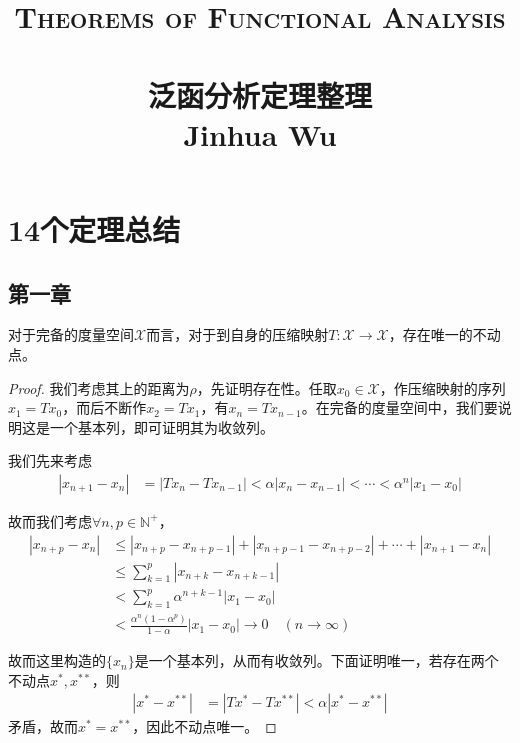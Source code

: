 
\usepackage{float}
\usepackage{enumitem}
\usepackage{amsmath}
\usepackage{amssymb}
\usepackage{hyperref}
\usepackage{cleveref}
\usepackage{annotate-equations}
\usepackage{zhlipsum}
\title{ \normalsize \textsc{Theorems of Functional Analysis}
		\\ [2.0cm]
		\HRule{1.5pt} \\
		\LARGE \textbf{\uppercase{泛函分析定理整理}
		\HRule{2.0pt} \\ [0.6cm] \LARGE{Jinhua Wu} \vspace*{10\baselineskip}}
		}
\date{}
\author{}

\maketitle
\tableofcontents 
\newpage
\setcounter{page}{1}
\chapter{14个定理总结}
\section{第一章}
\begin{theorem}[Banach压缩映像原理]
    对于完备的度量空间$\mathscr{X}$而言，对于到自身的压缩映射$T:\mathscr{X}\to\mathscr{X}$，存在唯一的不动点。
\end{theorem}
\begin{proof}
    我们考虑其上的距离为$\rho$，先证明存在性。任取$x_0\in\mathscr{X}$，作压缩映射的序列$x_1 = Tx_0$，而后不断作$x_2 = Tx_1$，有$x_n = Tx_{n-1}$。在完备的度量空间中，我们要说明这是一个基本列，即可证明其为收敛列。

    我们先来考虑
    \begin{align*}
        |x_{n+1} - x_{n}| &= |Tx_{n} - Tx_{n-1}| < \alpha |x_{n} - x_{n-1}| < \cdots < \alpha^{n} |x_1 - x_0| 
    \end{align*}

    故而我们考虑$\forall n,p\in\mathbb{N}^+$，
    \begin{align*}
        |x_{n+p} - x_n| &\leqslant |x_{n+p} - x_{n+p-1}| + |x_{n+p-1} - x_{n+p-2}| + \cdots + |x_{n+1} - x_n| \\
        & \leqslant \sum\limits_{k=1}^{p} |x_{n+k} - x_{n+k-1}| \\
        & < \sum\limits_{k=1}^{p} \alpha^{n+k-1} |x_{1} - x_{0}| \\
        & < \frac{\alpha^n(1-\alpha^p)}{1-\alpha} |x_1 - x_0| \to 0\quad (n\to\infty)
    \end{align*}

    故而这里构造的$\{x_n\}$是一个基本列，从而有收敛列。下面证明唯一，若存在两个不动点$x^*,x^{**}$，则
    \begin{align*}
        |x^* - x^{**}| & = |Tx^* - Tx^{**}| < \alpha |x^* - x^{**}|
    \end{align*}
    矛盾，故而$x^* = x^{**}$，因此不动点唯一。
\end{proof}

